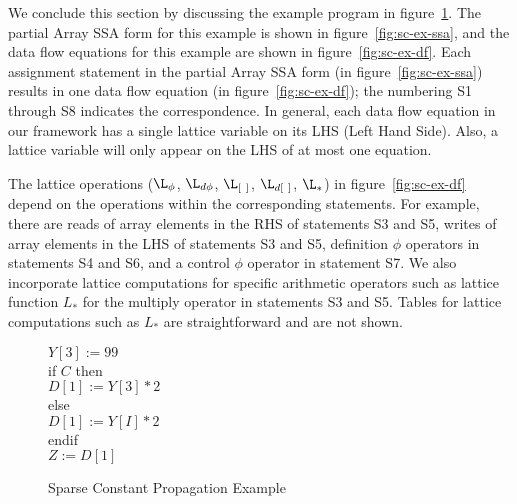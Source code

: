 We conclude this section by discussing the
example program in figure~\ref{fig:sc-ex-source}.  The
partial Array SSA form for this example is shown in
figure~\ref{fig:sc-ex-ssa}, and 
the data
flow equations for this example are shown in
figure~\ref{fig:sc-ex-df}. Each assignment statement
in the partial Array SSA form
(in figure~\ref{fig:sc-ex-ssa})
results in one data flow equation
(in figure~\ref{fig:sc-ex-df}); the numbering S1 through S8
indicates the correspondence.
In general, each data flow equation in our framework has a
single lattice variable on its LHS (Left Hand Side).  Also, a lattice
variable will only appear on the LHS of at most one equation.

The lattice operations ($\L_{\phi}$, $\L_{d\phi}$,  $\L_{[\ ]}$, $\L_{d[\ ]}$,
$\L_*$)
in figure~\ref{fig:sc-ex-df}
depend on the
operations within the corresponding
statements. For example, there are
reads of array elements in the RHS of statements S3 and S5, writes of 
array elements in the LHS of statements S3 and S5, 
definition $\phi$ operators in statements S4 and S6, and a control
$\phi$ operator in statement S7.
We also incorporate lattice computations 
for specific
arithmetic operators such as lattice function $L_*$ for
the multiply operator
in statements S3 and S5. Tables for
lattice computations such as $L_*$ 
are straightforward and are not shown. 


\begin{figure}%

\begin{center}
\parbox{3.0in}{
\begin{programa}
\Ta $Y[3] := 99$ \\
\Ta if $C$ then \\
\Tb   $D[1] := Y[3] * 2$ \\
\Ta else \\
\Tb   $D[1] := Y[I] * 2$ \\
\Ta endif \\
\Ta $Z := D[1]$ 
\end{programa}
}
\end{center}
\caption{Sparse Constant Propagation Example}
\label{fig:sc-ex-source}
\end{figure}

